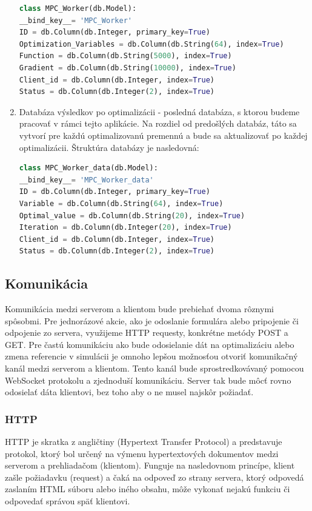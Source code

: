 \begin{enumerate}
{\begin{lstlisting}[language=Python]
class MPC_Worker(db.Model):
__bind_key__= 'MPC_Worker'
ID = db.Column(db.Integer, primary_key=True)
Optimization_Variables = db.Column(db.String(64), index=True)
Function = db.Column(db.String(5000), index=True)
Gradient = db.Column(db.String(10000), index=True)
Client_id = db.Column(db.Integer, index=True)
Status = db.Column(db.Integer(2), index=True)
\end{lstlisting}
}
\label{DB:WORKER_DATA}
\item{ Databáza výsledkov po optimalizácii - posledná databáza, s ktorou budeme pracovať v rámci tejto aplikácie. Na rozdiel od predošlých databáz, táto sa vytvorí pre každú optimalizovanú premennú a bude sa aktualizovať po každej optimalizácii. Štruktúra databázy je nasledovná:
\begin{lstlisting}[language=Python]
class MPC_Worker_data(db.Model):
__bind_key__= 'MPC_Worker_data'
ID = db.Column(db.Integer, primary_key=True)
Variable = db.Column(db.String(64), index=True)
Optimal_value = db.Column(db.String(20), index=True)
Iteration = db.Column(db.Integer(20), index=True)
Client_id = db.Column(db.Integer, index=True)
Status = db.Column(db.Integer(2), index=True)
\end{lstlisting}
}
\end{enumerate}

\subsection{Komunikácia}
Komunikácia medzi serverom a klientom bude prebiehať dvoma rôznymi spôsobmi. Pre jednorázové akcie, ako je odoslanie formulára alebo pripojenie či odpojenie zo servera, využijeme HTTP requesty, konkrétne metódy POST a GET. Pre častú komunikáciu ako bude odosielanie dát na optimalizáciu alebo zmena referencie v simulácii je omnoho lepšou možnosťou otvoriť komunikačný kanál medzi serverom a klientom. Tento kanál bude sprostredkovávaný pomocou WebSocket protokolu a zjednoduší komunikáciu. Server tak bude môcť rovno odosielať dáta klientovi, bez toho aby o ne musel najskôr požiadať. 

\subsubsection{HTTP}
HTTP je skratka z angličtiny (Hypertext Transfer Protocol) a predstavuje protokol, ktorý bol určený na výmenu hypertextových dokumentov medzi serverom a prehliadačom (klientom). Funguje na nasledovnom princípe, klient zašle požiadavku (request) a čaká na odpoveď zo strany servera, ktorý odpovedá zaslaním HTML súboru alebo iného obsahu, môže vykonať nejakú funkciu či odpovedať správou späť klientovi. \cite{bib5}

